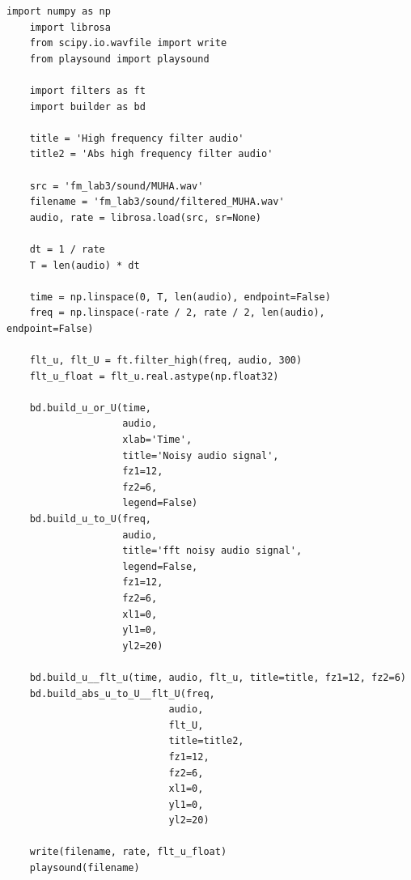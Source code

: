 \documentclass[a4paper, 12pt]{article}
\begin{document}
    \begin{lstlisting}[label=l8, caption={Файл audio.py. Фильтрация шумов в аудиозаписи}]
    import numpy as np
    import librosa
    from scipy.io.wavfile import write
    from playsound import playsound

    import filters as ft
    import builder as bd

    title = 'High frequency filter audio'
    title2 = 'Abs high frequency filter audio'

    src = 'fm_lab3/sound/MUHA.wav'
    filename = 'fm_lab3/sound/filtered_MUHA.wav'
    audio, rate = librosa.load(src, sr=None)

    dt = 1 / rate
    T = len(audio) * dt

    time = np.linspace(0, T, len(audio), endpoint=False)
    freq = np.linspace(-rate / 2, rate / 2, len(audio), endpoint=False)

    flt_u, flt_U = ft.filter_high(freq, audio, 300)
    flt_u_float = flt_u.real.astype(np.float32)

    bd.build_u_or_U(time,
                    audio,
                    xlab='Time',
                    title='Noisy audio signal',
                    fz1=12,
                    fz2=6,
                    legend=False)
    bd.build_u_to_U(freq,
                    audio,
                    title='fft noisy audio signal',
                    legend=False,
                    fz1=12,
                    fz2=6,
                    xl1=0,
                    yl1=0,
                    yl2=20)

    bd.build_u__flt_u(time, audio, flt_u, title=title, fz1=12, fz2=6)
    bd.build_abs_u_to_U__flt_U(freq,
                            audio,
                            flt_U,
                            title=title2,
                            fz1=12,
                            fz2=6,
                            xl1=0,
                            yl1=0,
                            yl2=20)

    write(filename, rate, flt_u_float)
    playsound(filename)
    \end{lstlisting}
\end{document}
